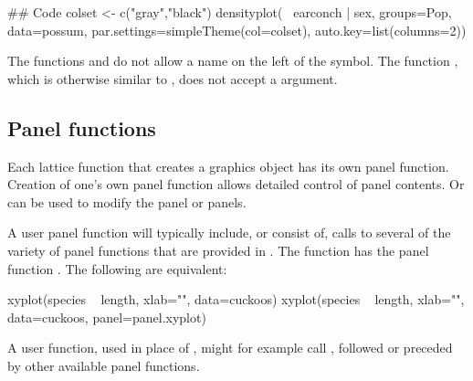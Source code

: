 \begin{Schunk}
\begin{Sinput}
## Code
colset <- c("gray","black")
densityplot(~ earconch | sex, groups=Pop,
            data=possum,
            par.settings=simpleTheme(col=colset),
            auto.key=list(columns=2))
\end{Sinput}
\end{Schunk}
The functions  and  do not
allow a name on the left of the \code{$\sim$} symbol. The function
, which is otherwise similar to ,
does not accept a  argument.

\subsection{Panel functions}\label{ss:panel}

  Each lattice function that creates a graphics
object has its own panel function.  Creation of one's own panel
function allows detailed control of panel contents. Or 
can be used to modify the panel or panels.

A user panel function will typically include, or consist of, calls to
several of the variety of panel functions that are provided in
.  The function  has the panel function
.  The following are equivalent:
\begin{Schunk}
\begin{Sinput}
xyplot(species ~ length, xlab="", data=cuckoos)
xyplot(species ~ length, xlab="", data=cuckoos,
       panel=panel.xyplot)
\end{Sinput}
\end{Schunk}
\noindent
A user function, used in place of ,
might for example call ,
followed or preceded by other available panel functions.

